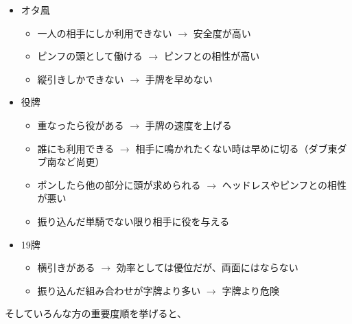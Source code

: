 \documentclass[../nankiru_main.tex]{subfiles}
\begin{document}
\begin{itemize}
  \item オタ風
  \begin{itemize}
    \item 一人の相手にしか利用できない $\to$ 安全度が高い
    \item ピンフの頭として働ける $\to$ ピンフとの相性が高い
    \item 縦引きしかできない $\to$ 手牌を早めない
  \end{itemize}
  \item 役牌
  \begin{itemize}
    \item 重なったら役がある $\to$ 手牌の速度を上げる
    \item 誰にも利用できる $\to$ 相手に鳴かれたくない時は早めに切る（ダブ東ダブ南など尚更）
    \item ポンしたら他の部分に頭が求められる $\to$ ヘッドレスやピンフとの相性が悪い
    \item 振り込んだ単騎でない限り相手に役を与える
  \end{itemize}
  \item 19牌
  \begin{itemize}
    \item 横引きがある $\to$ 効率としては優位だが、両面にはならない
    \item 振り込んだ組み合わせが字牌より多い $\to$ 字牌より危険
  \end{itemize}
\end{itemize}

そしていろんな方の重要度順を挙げると、
\end{document}
